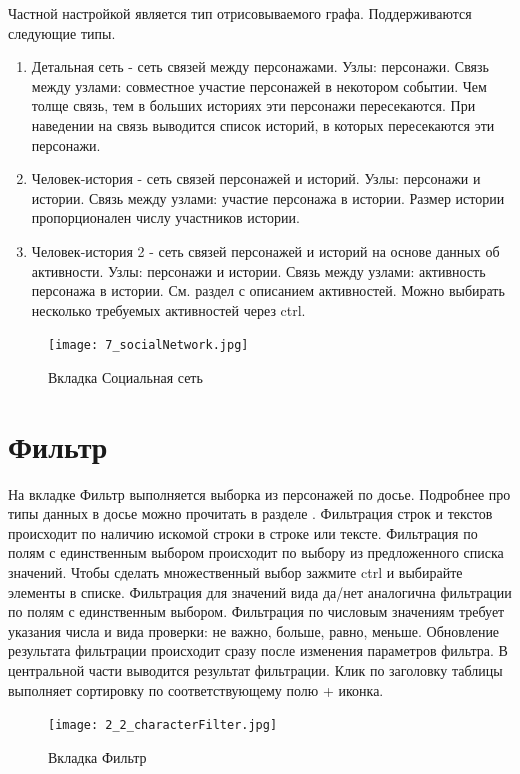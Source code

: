 \documentclass[a4paper,oneside,10pt,russian]{sphinxmanual}
\begin{document}
Частной настройкой является тип отрисовываемого графа. Поддерживаются следующие типы.
\begin{enumerate}
\item {}
Детальная сеть - сеть связей между персонажами. Узлы: персонажи. Связь между узлами: совместное участие персонажей в некотором событии. Чем толще связь, тем в больших историях эти персонажи пересекаются. При наведении на связь выводится список историй, в которых пересекаются эти персонажи.

\item {}
Человек-история - сеть связей персонажей и историй. Узлы: персонажи и истории. Связь между узлами: участие персонажа в истории. Размер истории пропорционален числу участников истории.

\item {}
Человек-история 2 - сеть связей персонажей и историй на основе данных об активности. Узлы: персонажи и истории. Связь между узлами: активность персонажа в истории. См. раздел с описанием активностей. Можно выбирать несколько требуемых активностей через ctrl.

\end{enumerate}
\begin{figure}[H]
\centering
\capstart

\texttt{[image: 7\_socialNetwork.jpg]}
\caption{Вкладка Социальная сеть}\end{figure}

\newpage

\section{Фильтр}
\label{pages:id16}\label{pages:characters-filter}
На вкладке Фильтр выполняется выборка из персонажей по досье. Подробнее про типы данных в досье можно прочитать в разделе {\hyperref[pages:characters-profile-editor]{\emph{}}}. Фильтрация строк и текстов происходит по наличию искомой строки в строке или тексте. Фильтрация по полям с единственным выбором происходит по выбору из предложенного списка значений. Чтобы сделать множественный выбор зажмите ctrl и выбирайте элементы в списке. Фильтрация для значений вида да/нет аналогична фильтрации по полям с единственным выбором. Фильтрация по числовым значениям требует указания числа и вида проверки: не важно, больше, равно, меньше. Обновление результата фильтрации происходит сразу после изменения параметров фильтра. В центральной части выводится результат фильтрации. Клик по заголовку таблицы выполняет сортировку по соответствующему полю + иконка.
\begin{figure}[H]
\centering
\capstart

\texttt{[image: 2\_2\_characterFilter.jpg]}
\caption{Вкладка Фильтр}\end{figure}



\renewcommand{\indexname}{Алфавитный указатель}
\printindex
\end{document}
